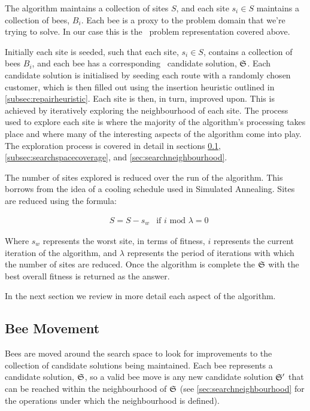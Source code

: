 The algorithm maintains a collection of sites $S$, and each site $s_i \in S$ maintains a collection of bees, $B_i$. Each bee is a proxy to the problem domain that we're trying to solve. In our case this is the \VRP\ problem representation covered above.

Initially each site is seeded, such that each site, $s_i \in S$, contains a collection of bees $B_i$, and each bee has a corresponding \VRP\ candidate solution, $\mathfrak{S}$. Each candidate solution is initialised by seeding each route with a randomly chosen customer, which is then filled out using the insertion heuristic outlined in \ref{subsec:repairheuristic}. Each site is then, in turn, improved upon. This is achieved by iteratively exploring the neighbourhood of each site. The process used to explore each site is where the majority of the algorithm's processing takes place and where many of the interesting aspects of the algorithm come into play. The exploration process is covered in detail in sections \ref{sec:beemovement}, \ref{subsec:searchspacecoverage}, and \ref{sec:searchneighbourhood}.

The number of sites explored is reduced over the run of the algorithm. This borrows from the idea of a cooling schedule used in Simulated Annealing. Sites are reduced using the formula:

\begin{align}
   & S = S - s_w & \text{if $i \text{ mod } \lambda = 0$}
\end{align}

Where $s_w$ represents the worst site, in terms of fitness, $i$ represents the current iteration of the algorithm, and $\lambda$ represents the period of iterations with which the number of sites are reduced. Once the algorithm is complete the $\mathfrak{S}$ with the best overall fitness is returned as the answer.

In the next section we review in more detail each aspect of the algorithm. 

\subsection{Bee Movement}
\label{sec:beemovement}

Bees are moved around the search space to look for improvements to the collection of candidate solutions being maintained. Each bee represents a candidate solution, $\mathfrak{S}$, so a valid bee move is any new candidate solution $\mathfrak{S}'$ that can be reached within the neighbourhood of $\mathfrak{S}$ (see \ref{sec:searchneighbourhood} for the operations under which the neighbourhood is defined).

